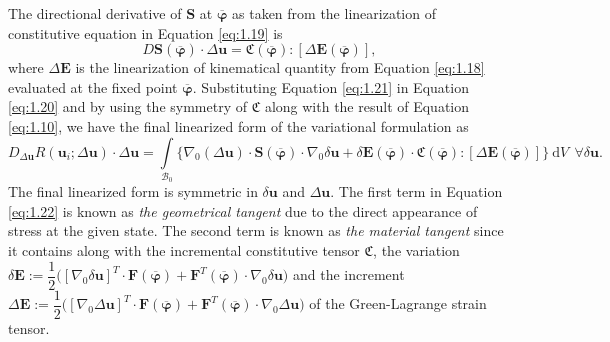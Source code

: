 The directional derivative of $\mathbf{S}$ at $\overline{\bm{\varphi}}$ as taken from the linearization of constitutive equation in Equation \eqref{eq:1.19} is 
\begin{equation}
D \mathbf{S}(\overline{\bm{\varphi}}) \cdot \Delta\mathbf{u} = \mathfrak{C}(\overline{\bm{\varphi}}) : \left[ \Delta \mathbf{E}(\overline{\bm{\varphi}}) \right],
\label{eq:1.21}
\end{equation}
where $\Delta \mathbf{E}$ is the linearization of kinematical quantity from Equation \eqref{eq:1.18} evaluated at the fixed point $\overline{\bm{\varphi}}$.  Substituting Equation \eqref{eq:1.21} in Equation \eqref{eq:1.20} and by using the symmetry of $\mathfrak{C}$ along with the result of Equation \eqref{eq:1.10}, we have the final linearized form of the variational formulation as
\begin{equation}
D_{\Delta\mathbf{u}} R(\mathbf{u}_i; \Delta \mathbf{u}) \cdot \Delta\mathbf{u} = \int\limits_{\mathcal{B}_0} \Big\lbrace \nabla_0 (\Delta\mathbf{u}) \cdot \mathbf{S}(\overline{\bm{\varphi}}) \cdot \nabla_0 \delta \mathbf{u} + \delta \mathbf{E}(\overline{\bm{\varphi}}) \cdot \mathfrak{C}(\overline{\bm{\varphi}}) : \left[ \Delta\mathbf{E}(\overline{\bm{\varphi}}) \right] \Big\rbrace \ \mathrm{d}V \ \ \forall \delta\mathbf{u}.
\label{eq:1.22}
\end{equation}
The final linearized form is symmetric in $\delta\mathbf{u}$ and $\Delta\mathbf{u}$. The first term in Equation \eqref{eq:1.22} is known as \textit{the geometrical tangent} due to the direct appearance of stress at the given state. The second term is known as \textit{the material tangent} since it contains along with the incremental constitutive tensor $\mathfrak{C}$, the variation $\delta \mathbf{E} := \dfrac{1}{2} \Big(\left[\nabla_0 \delta\mathbf{u} \right]^T \cdot \mathbf{F}(\overline{\bm{\varphi}}) + \mathbf{F}^T (\overline{\bm{\varphi}}) \cdot \nabla_0 \delta\mathbf{u} \Big)$ and the increment $\Delta \mathbf{E} := \dfrac{1}{2} \Big(\left[\nabla_0 \Delta\mathbf{u}\right]^T \cdot \mathbf{F}(\overline{\bm{\varphi}}) + \mathbf{F}^T (\overline{\bm{\varphi}}) \cdot \nabla_0 \Delta\mathbf{u} \Big)$ of the Green-Lagrange strain tensor.  
 
